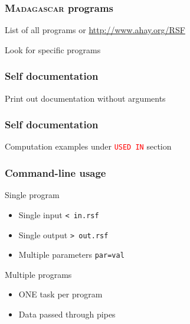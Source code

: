 \begin{frame}
  \frametitle{\textsc{Madagascar} programs}
  
  \begin{block}{List of all programs}
     or \url{http://www.ahay.org/RSF}
  \end{block}
  

  \pause
  \begin{block}{Look for specific programs}
  \end{block}
  
\end{frame}

\begin{frame}
  \frametitle{Self documentation}

  \begin{block}{Print out documentation}
     without arguments
  \end{block}
  
\end{frame}

\begin{frame}
  \frametitle{Self documentation}
  
  
  
  \pause
  \begin{block}{}
    Computation examples under \textcolor{red}{\texttt{USED IN}} section
  \end{block}
  
\end{frame} 

\begin{frame}
  \frametitle{Command-line usage}

  \begin{block}{Single program}
  \end{block}
  \begin{itemize}
  \item Single input \texttt{< in.rsf}
  \item Single output \texttt{> out.rsf}
  \item Multiple parameters \texttt{par=val}
  \end{itemize}

  \pause
  \begin{block}{Multiple programs}
  \end{block}
  \begin{itemize}
  \item ONE task per program
  \item Data passed through pipes
  \end{itemize}
\end{frame}

